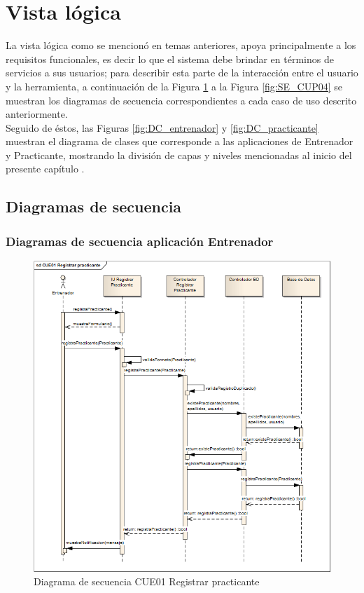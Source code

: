 \section{Vista lógica}
La vista lógica como se mencionó en temas anteriores, apoya principalmente a los requisitos funcionales, es decir lo que el sistema debe brindar en términos de servicios a sus usuarios; para describir esta parte de la interacción entre el usuario y la herramienta, a continuación de la Figura \ref{fig:SE_CUE01} a la Figura \ref{fig:SE_CUP04} se muestran los diagramas de secuencia correspondientes a cada caso de uso descrito anteriormente.\\

Seguido de éstos, las Figuras \ref{fig:DC_entrenador} y \ref{fig:DC_practicante} muestran el diagrama de clases que corresponde a  las aplicaciones de Entrenador y Practicante, mostrando la división de capas y niveles mencionadas al inicio del presente capítulo .

\clearpage

\subsection{Diagramas de secuencia}
\subsubsection{Diagramas de secuencia aplicación Entrenador}

\begin{figure}[H]
	\begin{center}
		\includegraphics[scale=0.6]{./Figuras/Secuencias/CUE01Registrar_practicante}
	\end{center}
	\caption{Diagrama de secuencia CUE01 Registrar practicante}
	\label{fig:SE_CUE01}
\end{figure}

